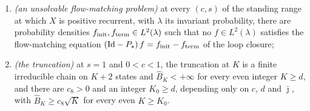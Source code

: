 \begin{theorem}
\begin{enumerate}
    moreover $c_7>0$, depending only on $c$, $d$ and $\lambda_1,\dots,\lambda_{2m_0}$ with
    $m_0$ the integer of Theorem~\ref{theo:doubling_decay}, and an integer $m_2>d$ with
    $\|f_m\|_{L^2(\lambda)}\geq c_7\sqrt m\,\|(\mathrm{Id}-P_\star)f_m\|_{L^2(\lambda)}$ for
    every $m\geq m_2$;
    \item \emph{(an unsolvable flow-matching problem)} at every $(c,s)$ of the standing range
    at which $X$ is positive recurrent, with $\lambda$ its invariant probability, there are
    probability densities $f_{\mathrm{init}},f_{\mathrm{term}}\in L^2(\lambda)$ such that no $f\in L^2(\lambda)$
    satisfies the flow-matching equation
    $\left(\mathrm{Id}-P_\star\right)f=f_{\mathrm{init}}-f_{\mathrm{term}}$ of the loop closure;
    \item \emph{(the truncation)} at $s=1$ and $0<c<1$, the truncation at $K$ is a finite
    irreducible chain on $K+2$ states and $\widehat B_K<+\infty$ for every even integer
    $K\geq d$, and there are $c_8>0$ and an integer $K_0\geq d$, depending only on $c$, $d$
    and $\bar\jmath$, with $\widehat B_K\geq c_8\sqrt K$ for every even $K\geq K_0$.
\end{enumerate}
\end{theorem}

